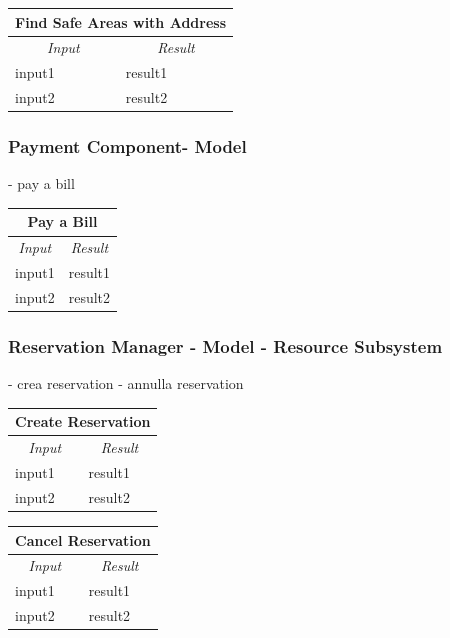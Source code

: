 \documentclass[english]{article}
\begin{document}
\begin{center}
	\begin{tabular}{ | m{6cm} | m{6cm} | }
		\hline
		\multicolumn{2}{|c|}{\textbf{Find Safe Areas with Address}} \\
		\hline
		\multicolumn{1}{|c|}{\textit{Input}} & \multicolumn{1}{c|}{\textit{Result}} \\
		\hline
		input1 & result1 \\
		\hline
		input2 & result2 \\
		\hline
	\end{tabular}
\end{center}

\subsubsection{Payment Component- Model}
- pay a bill

\begin{center}
	\begin{tabular}{ | m{6cm} | m{6cm} | }
		\hline
		\multicolumn{2}{|c|}{\textbf{Pay a Bill}} \\
		\hline
		\multicolumn{1}{|c|}{\textit{Input}} & \multicolumn{1}{c|}{\textit{Result}} \\
		\hline
		input1 & result1 \\
		\hline
		input2 & result2 \\
		\hline
	\end{tabular}
\end{center}

\subsubsection{Reservation Manager - Model - Resource Subsystem}
- crea reservation
- annulla reservation

\begin{center}
	\begin{tabular}{ | m{6cm} | m{6cm} | }
		\hline
		\multicolumn{2}{|c|}{\textbf{Create Reservation}} \\
		\hline
		\multicolumn{1}{|c|}{\textit{Input}} & \multicolumn{1}{c|}{\textit{Result}} \\
		\hline
		input1 & result1 \\
		\hline
		input2 & result2 \\
		\hline
	\end{tabular}
\end{center}

\begin{center}
	\begin{tabular}{ | m{6cm} | m{6cm} | }
		\hline
		\multicolumn{2}{|c|}{\textbf{Cancel Reservation}} \\
		\hline
		\multicolumn{1}{|c|}{\textit{Input}} & \multicolumn{1}{c|}{\textit{Result}} \\
		\hline
		input1 & result1 \\
		\hline
		input2 & result2 \\
		\hline
	\end{tabular}
\end{center}
\end{document}
